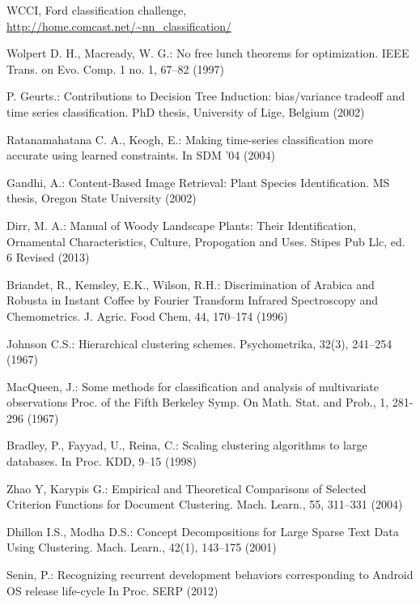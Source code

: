 \documentclass{llncs}
\begin{document}
\begin{thebibliography}{5}
WCCI, Ford classification challenge, \url{http://home.comcast.net/~nn_classification/}

Wolpert D. H., Macready, W. G.:
No free lunch theorems for optimization.
IEEE Trans. on Evo. Comp. 1 no. 1, 67--82 (1997)

P. Geurts.:
Contributions to Decision Tree Induction: bias/variance tradeoﬀ and time series classiﬁcation.
PhD thesis, University of Lige, Belgium (2002)

Ratanamahatana C. A., Keogh, E.:
Making time-series classification more accurate using learned constraints. 
In SDM '04 (2004)

Gandhi, A.:
Content-Based Image Retrieval: Plant Species Identification. 
MS thesis, Oregon State University (2002)

Dirr, M. A.:
Manual of Woody Landscape Plants: Their Identification, Ornamental Characteristics,
Culture, Propogation and Uses.
Stipes Pub Llc, ed. 6 Revised (2013)

Briandet, R., Kemsley, E.K., Wilson, R.H.:
Discrimination of Arabica and Robusta in Instant Coffee by Fourier Transform Infrared Spectroscopy
and Chemometrics.
J. Agric. Food Chem, 44, 170--174 (1996)

Johnson C.S.:
Hierarchical clustering schemes.
Psychometrika, 32(3), 241--254 (1967)

MacQueen, J.:
Some methods for classification and analysis of multivariate observations
Proc. of the Fifth Berkeley Symp. On  Math. Stat. and Prob., 1, 281-296 (1967)

Bradley, P., Fayyad, U., Reina, C.:
Scaling clustering algorithms to large databases. 
In Proc. KDD, 9--15 (1998)

Zhao Y, Karypis G.:
Empirical and Theoretical Comparisons of Selected Criterion Functions for Document Clustering.
Mach. Learn., 55, 311--331 (2004)

Dhillon I.S., Modha D.S.:
Concept Decompositions for Large Sparse Text Data Using Clustering.
Mach. Learn., 42(1), 143--175 (2001)

Senin, P.: 
Recognizing recurrent development behaviors corresponding to Android OS release life-cycle
In Proc. SERP (2012)



\end{thebibliography}

%
\end{document}

